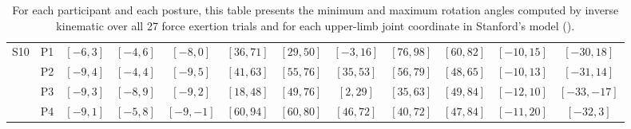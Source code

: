 \begin{table}[!ht]
{\begin{tabular}{|c|c||c|c|c|c|c|c|c|c|c|c|}
    \hline
    \hline
    \multirow{4}{*}{S10} & P1 & $[-6, 3]$ & $[-4, 6]$ & $[-8, 0]$ & $[36, 71]$ & $[29, 50]$ & $[-3, 16]$ & $[76, 98]$ & $[60, 82]$ & $[-10, 15]$ & $[-30, 18]$ \\
     & P2 & $[-9, 4]$ & $[-4, 4]$ & $[-9, 5]$ & $[41, 63]$ & $[55, 76]$ & $[35, 53]$ & $[56, 79]$ & $[48, 65]$ & $[-10, 13]$ & $[-31, 14]$ \\
     & P3 & $[-9, 3]$ & $[-8, 9]$ & $[-9, 2]$ & $[18, 48]$ & $[49, 76]$ & $[2, 29]$ & $[35, 63]$ & $[49, 84]$ & $[-12, 10]$ & $[-33, -17]$ \\
     & P4 & $[-9, 1]$ & $[-5, 8]$ & $[-9, -1]$ & $[60, 94]$ & $[60, 80]$ & $[46, 72]$ & $[40, 72]$ & $[47, 84]$ & $[-11, 20]$ & $[-32, 3]$ \\
    \hline
    
    \end{tabular}}
    \caption{For each participant and each posture, this table presents the minimum and maximum rotation angles computed by inverse kinematic over all 27 force exertion trials and for each upper-limb joint coordinate in Stanford's model (\cite{holzbaurModelUpperExtremity2005}).}
    \label{tab:posture_stability_ranges}
\end{table}

